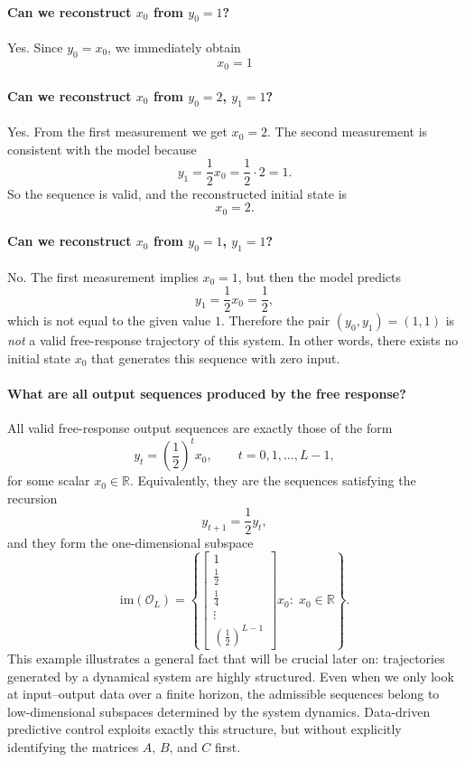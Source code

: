 \paragraph{Can we reconstruct $x_0$ from $y_0=1$?}
Yes. Since $y_0=x_0$, we immediately obtain
\[
x_0 = 1
\]

\paragraph{Can we reconstruct $x_0$ from $y_0=2$, $y_1=1$?}
Yes. From the first measurement we get $x_0=2$. The second measurement is consistent with the model because
\[
y_1 = \frac12 x_0 = \frac12 \cdot 2 = 1.
\]
So the sequence is valid, and the reconstructed initial state is
\[
x_0=2.
\]

\paragraph{Can we reconstruct $x_0$ from $y_0=1$, $y_1=1$?}
No. The first measurement implies $x_0=1$, but then the model predicts
\[
y_1 = \frac12 x_0 = \frac12,
\]
which is not equal to the given value $1$. Therefore the pair $(y_0,y_1)=(1,1)$ is \emph{not} a valid free-response trajectory of this system. In other words, there exists no initial state $x_0$ that generates this sequence with zero input.

\paragraph{What are all output sequences produced by the free response?}
All valid free-response output sequences are exactly those of the form
\begin{equation*}
y_t = \left(\frac12\right)^t x_0, \qquad t=0,1,\dots,L-1,
\end{equation*}
for some scalar $x_0 \in \mathbb{R}$. Equivalently, they are the sequences satisfying the recursion
\[
y_{t+1} = \frac12 y_t,
\]
and they form the one-dimensional subspace
\[
\mathrm{im}(\mathcal{O}_L)
=
\left\{
\begin{bmatrix}
1\\[1mm]
\frac12\\[1mm]
\frac14\\
\vdots\\
\left(\frac12\right)^{L-1}
\end{bmatrix}
x_0
:\; x_0 \in \mathbb{R}
\right\}.
\]
This example illustrates a general fact that will be crucial later on: trajectories generated by a dynamical system are highly structured. Even when we only look at input--output data over a finite horizon, the admissible sequences belong to low-dimensional subspaces determined by the system dynamics. Data-driven predictive control exploits exactly this structure, but without explicitly identifying the matrices $A$, $B$, and $C$ first.

